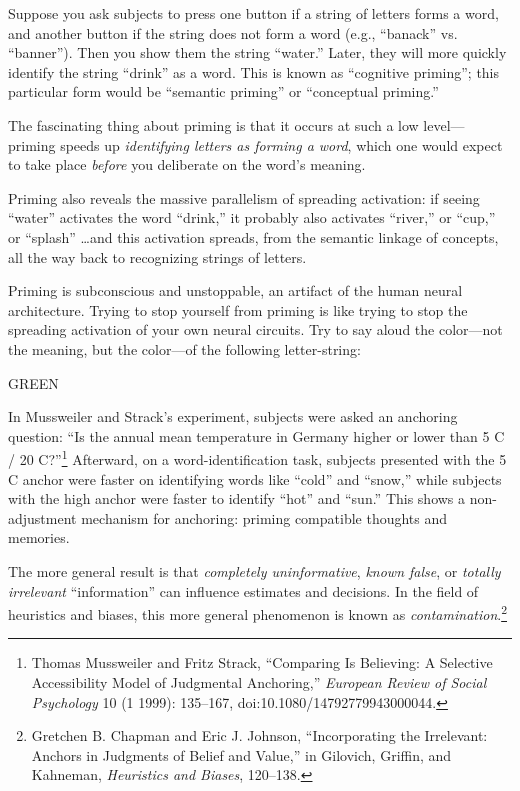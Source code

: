 
{
 Suppose you ask subjects to press one button if a string of
letters forms a word, and another button if the string does not form a
word (e.g., ``banack'' vs.
``banner''). Then you show them the
string ``water.'' Later, they will
more quickly identify the string
``drink'' as a word. This is known
as ``cognitive priming''; this
particular form would be ``semantic
priming'' or ``conceptual
priming.'' }

{
 The fascinating thing about priming is that it occurs at such a
low level---priming speeds up \textit{identifying letters as forming a
word}, which one would expect to take place \textit{before} you
deliberate on the word's meaning.}

{
 Priming also reveals the massive parallelism of spreading
activation: if seeing ``water''
activates the word ``drink,'' it
probably also activates ``river,''
or ``cup,'' or
``splash'' \ldots and this activation
spreads, from the semantic linkage of concepts, all the way back to
recognizing strings of letters.}

{
 Priming is subconscious and unstoppable, an artifact of the human
neural architecture. Trying to stop yourself from priming is like
trying to stop the spreading activation of your own neural circuits.
Try to say aloud the color---not the meaning, but the color---of the
following letter-string:\newline
}

{\centering
 GREEN
\par}


\bigskip

{
 In Mussweiler and Strack's experiment, subjects
were asked an anchoring question: ``Is the annual mean
temperature in Germany higher or lower than 5 C / 20
C?''\footnote{Thomas Mussweiler and Fritz Strack,
``Comparing Is Believing: A Selective Accessibility
Model of Judgmental Anchoring,'' \textit{European
Review of Social Psychology} 10 (1 1999): 135--167,
doi:10.1080/14792779943000044.} Afterward, on a
word-identification task, subjects presented with the 5 C anchor were
faster on identifying words like
``cold'' and
``snow,'' while subjects with the
high anchor were faster to identify
``hot'' and
``sun.'' This shows a non-adjustment
mechanism for anchoring: priming compatible thoughts and memories.}

{
 The more general result is that \textit{completely uninformative},
\textit{known false}, or \textit{totally irrelevant}
``information'' can influence
estimates and decisions. In the field of heuristics and biases, this
more general phenomenon is known as
\textit{contamination}.\footnote{Gretchen B. Chapman and Eric J. Johnson,
``Incorporating the Irrelevant: Anchors in Judgments
of Belief and Value,'' in Gilovich, Griffin, and
Kahneman, \textit{Heuristics and Biases}, 120--138.}}

